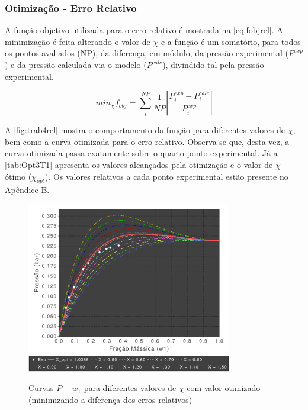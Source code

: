 \subsubsection{Otimização - Erro Relativo}
A função objetivo utilizada para o erro relativo é mostrada na
\autoref{eq:fobjrel}. A minimização é feita alterando o valor de $\chi$ e a
função é um somatório, para todos os pontos avaliados (NP), da diferença, em módulo, da pressão 
experimental ($P^{exp}$) e da pressão calculada via o modelo ($P^{calc}$),
divindido tal pela pressão experimental.

\begin{equation}\label{eq:fobjrel}
min_\chi f_{obj} = \sum_i^{NP}\frac{1}{NP}\left| \frac{P_i^{exp} -
P_i^{calc}}{P_i^{exp}} \right|
\end{equation}


A \autoref{fig:trab4rel} mostra o comportamento da função para diferentes
valores de $\chi$, bem como a curva otimizada para o erro relativo. Observa-se
que, desta vez, a curva otimizada passa exatamente sobre o quarto ponto
experimental. Já a \autoref{tab:Opt3T1} apresenta os valores alcançados pela
otimização e o valor de $\chi$ ótimo ($\chi_{opt}$). Os valores relativos a cada
ponto experimental estão presente no Apêndice B.


\begin{figure}[htb]
\centering
{\includegraphics[width=0.8\textwidth]{img/Trab4Rel.pdf}} 
\caption{Curvas $P-w_1$ para diferentes valores de $\chi$ com valor otimizado
(minimizando a diferença  dos erros relativos)}
\label{fig:trab4rel}
\end{figure}


